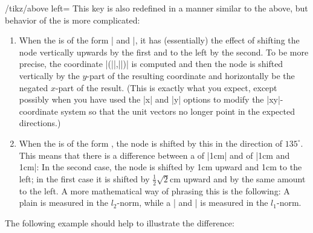 \begin{key}{/tikz/above left=}
    This key is also redefined in a manner similar to the above, but behavior
    of the  is more complicated:
    \begin{enumerate}
        \item When the  is of the form
            | and |, it has
            (essentially) the effect of shifting the node vertically upwards by
            the first  and to the left by the second.
            To be more precise, the coordinate |(||,||)| is computed and
            then the node is shifted vertically by the $y$-part of the
            resulting coordinate and horizontally be the negated $x$-part of
            the result. (This is exactly what you expect, except possibly when
            you have used the |x| and |y| options to modify the |xy|-coordinate
            system so that the unit  vectors no longer point in the expected
            directions.)
        \item When the  is of the form , the node is shifted by this 
            in the direction of $135^\circ$. This means that there is a
            difference between a  of |1cm| and of
            |1cm and 1cm|: In the second case, the node is shifted by 1cm
            upward and 1cm to the left; in the first case it is shifted by
            $\frac{1}{2}\sqrt{2}$cm upward and by the same amount to the left.
            A more mathematical way of phrasing this is the following: A plain
             is measured in the $l_2$-norm, while a
            | and | is measured in the
            $l_1$-norm.
    \end{enumerate}
    The following example should help to illustrate the difference:
\begin{codeexample}[preamble={\usetikzlibrary{positioning}}]
\end{codeexample}
\end{key}
